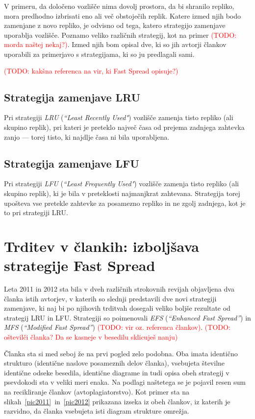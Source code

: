\documentclass[a4paper, 12pt]{book}
\newcommand{\newterm}{\textit}
\newcommand{\TODO}[1]{\textcolor{red}{(TODO: #1)}}
\begin{document}
V primeru, da določeno vozlišče nima dovolj prostora, da bi shranilo repliko,
mora predhodno izbrisati eno ali več obstoječih replik. Katere izmed njih bodo
zamenjane z novo repliko, je odvisno od tega, katero strategijo zamenjave
uporablja vozlišče. Poznamo veliko različnih strategij, kot na primer
\TODO{morda naštej nekaj?}. Izmed njih bom opisal dve, ki so jih avtorji
člankov uporabili za primerjavo s strategijama, ki so ju predlagali sami.

\TODO{kakšna referenca na vir, ki Fast Spread opisuje?}

\subsection{Strategija zamenjave LRU}

Pri strategiji \newterm{LRU} (\newterm{``Least Recently Used"}) vozlišče
zamenja tisto repliko (ali skupino replik), pri kateri je preteklo največ
časa od prejema zadnjega zahtevka zanjo --- torej tisto, ki najdlje časa
ni bila uporabljena.

\subsection{Strategija zamenjave LFU}

Pri strategiji \newterm{LFU} (\newterm{``Least Frequently Used"}) vozlišče
zamenja tisto repliko (ali skupino replik), ki je bila v preteklosti
najmanjkrat zahtevana. Strategija torej upošteva vse pretekle zahtevke za
posamezno repliko in ne zgolj zadnjega, kot je to pri strategiji LRU.

\section{Trditev v člankih: izboljšava strategije Fast Spread}

Leta 2011 in 2012 sta bila v dveh različnih strokovnih revijah objavljena
dva članka istih avtorjev, v katerih so slednji predstavili dve novi
strategiji zamenjave, ki naj bi po njihovih trditvah dosegali veliko boljše
rezultate od strategij LRU in LFU. Strategiji
so poimenovali \newterm{EFS} (\newterm{``Enhanced Fast Spread''}) in
\newterm{MFS} (\newterm{``Modified Fast Spread''})
\TODO{vir oz. referenca člankov}. \TODO{oštevilči članka? Da se kasneje v besedilu sklicuješ nanju}

Članka sta si med seboj že na prvi pogled zelo podobna. Oba imata identično
strukturo (identične naslove posameznih delov članka), vsebujeta številne
identične odseke besedila, identične diagrame in tudi opisa obeh strategij
v psevdokodi sta v veliki meri enaka. Na podlagi naštetega se je pojavil
resen sum na recikliranje člankov (avtoplagiatorstvo). Kot primer sta na
slikah~\ref{pic2011}~in~\ref{pic2012} prikazana izseka iz obeh člankov,
iz katerih je razvidno, da članka vsebujeta isti diagram strukture omrežja.
\end{document}
